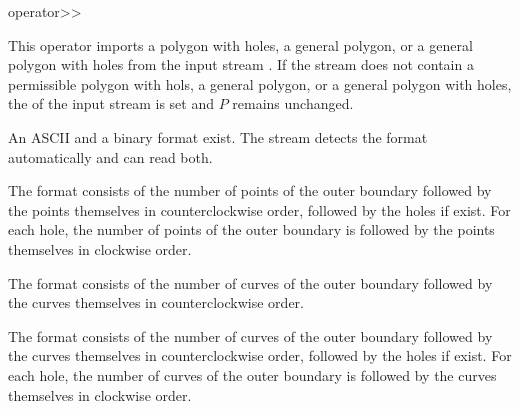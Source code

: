 
\ccHtmlNoClassLinks
\begin{ccRefFunction}{operator>>}
\label{refPolygon_with_holes_operator_rightshift}

\ccDefinition

This operator imports a polygon with holes, a general polygon, or a general 
polygon with holes from the input stream . If the stream  
does not contain a permissible polygon with hols, a general polygon, or a 
general polygon with holes, the  of the input stream 
 is set and $P$ remains unchanged.

An ASCII and a binary format exist. The stream detects the
format automatically and can read both.

The format consists of the number of points of the outer boundary followed 
by the points themselves in counterclockwise order, followed by the holes if 
exist. For each hole, the number of points of the outer boundary is followed 
by the points themselves in clockwise order.


The format consists of the number of curves of the outer boundary followed
by the curves themselves in counterclockwise order.


The format consists of the number of curves of the outer boundary followed 
by the curves themselves in counterclockwise order, followed by the holes 
if exist. For each hole, the number of curves of the outer boundary is 
followed by the curves themselves in clockwise order.

\ccSeeAlso

\\ 
\\ 
\\ 


\end{ccRefFunction}

